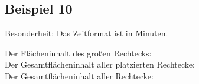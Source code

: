 \subsection{Beispiel 10}\label{ex:10}
Besonderheit: Das Zeitformat ist in Minuten.
\vspace{.4cm}

\noindent Der Flächeninhalt des großen Rechtecks: \\
Der Gesamtflächeninhalt aller platzierten Rechtecke: \\
Der Gesamtflächeninhalt aller Rechtecke: 